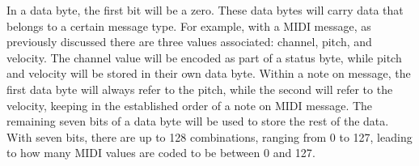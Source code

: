 In a data byte, the first bit will be a zero. These data bytes will carry data that belongs to a certain message type. For example, with a  MIDI message, as previously discussed there are three values associated: channel, pitch, and velocity. The channel value will be encoded as part of a status byte, while pitch and velocity will be stored in their own data byte\cite{Kirk_Hunt_2013}. Within a note on message, the first data byte will always refer to the pitch, while the second will refer to the velocity, keeping in the established order of a note on MIDI message. The remaining seven bits of a data byte will be used to store the rest of the data. With seven bits, there are up to 128 combinations, ranging from 0 to 127, leading to how many MIDI values are coded to be between 0 and 127\cite{Huber_2012}.